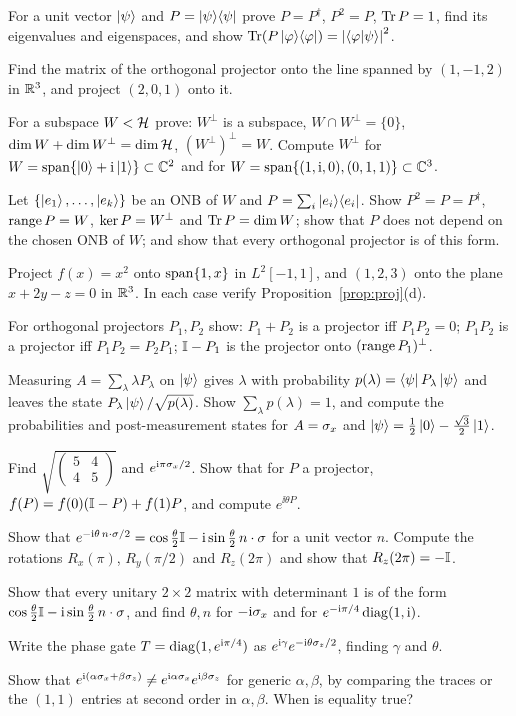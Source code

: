 \begin{exerciseset}
   For a unit vector $\left|\psi\right\rangle$ and $P=\left|\psi\right\rangle\!\left\langle\psi\right|$ prove $P=P^\dagger$, $P^2=P$, $\operatorname{Tr} P=1$, find its eigenvalues and eigenspaces, and show $\operatorname{Tr}(P\left|\varphi\right\rangle\!\left\langle\varphi\right|)=\left|\left\langle\varphi\middle|\psi\right\rangle\right|^2$.

   Find the matrix of the orthogonal projector onto the line spanned by $(1,-1,2)$ in $\mathbb{R}^3$, and project $(2,0,1)$ onto it.

   For a subspace $W<\mathcal{H}$ prove: $W^\perp$ is a subspace, $W\cap W^\perp=\{0\}$, $\dim W+\dim W^\perp=\dim\mathcal{H}$, $(W^\perp)^\perp=W$. Compute $W^\perp$ for $W=\operatorname{span}\{\left|0\right\rangle+\mathrm{i}\left|1\right\rangle\}\subset\mathbb{C}^2$ and for $W=\operatorname{span}\{(1,\mathrm{i},0),(0,1,1)\}\subset\mathbb{C}^3$.

   Let $\{\left|e_1\right\rangle,\dots,\left|e_k\right\rangle\}$ be an ONB of $W$ and $P=\sum_i\left|e_i\right\rangle\!\left\langle e_i\right|$. Show $P^2=P=P^\dagger$, $\operatorname{range} P=W$, $\operatorname{ker} P=W^\perp$ and $\operatorname{Tr} P=\dim W$; show that $P$ does not depend on the chosen ONB of $W$; and show that every orthogonal projector is of this form.

   Project $f(x)=x^2$ onto $\operatorname{span}\{1,x\}$ in $L^2[-1,1]$, and $(1,2,3)$ onto the plane $x+2y-z=0$ in $\mathbb{R}^3$. In each case verify Proposition~\ref{prop:proj}(d).

   For orthogonal projectors $P_1,P_2$ show: $P_1+P_2$ is a projector iff $P_1P_2=0$; $P_1P_2$ is a projector iff $P_1P_2=P_2P_1$; $\mathbb{I}-P_1$ is the projector onto $(\operatorname{range} P_1)^\perp$.

   Measuring $A=\sum_\lambda\lambda P_\lambda$ on $\left|\psi\right\rangle$ gives $\lambda$ with probability $p(\lambda)=\left\langle\psi\right| P_\lambda\left|\psi\right\rangle$ and leaves the state $P_\lambda\left|\psi\right\rangle/\sqrt{p(\lambda)}$. Show $\sum_\lambda p(\lambda)=1$, and compute the probabilities and post-measurement states for $A=\sigma_x$ and $\left|\psi\right\rangle=\tfrac12\left|0\right\rangle-\tfrac{\sqrt3}2\left|1\right\rangle$.

   Find $\sqrt{\begin{pmatrix}5&4\\4&5\end{pmatrix}}$ and $e^{\mathrm{i}\pi\sigma_x/2}$. Show that for $P$ a projector, $f(P)=f(0)(\mathbb{I}-P)+f(1)P$, and compute $e^{\ii\theta P}$.

   Show that $e^{-\mathrm{i}\theta\,n\cdot\sigma/2}=\cos\frac\theta2\mathbb{I}-\mathrm{i}\sin\frac\theta2\,n\cdot\sigma$ for a unit vector $n$. Compute the rotations $R_x(\pi)$, $R_y(\pi/2)$ and $R_z(2\pi)$ and show that $R_z(2\pi)=-\mathbb{I}$.

   Show that every unitary $2\times2$ matrix with determinant $1$ is of the form $\cos\frac\theta2\mathbb{I}-\mathrm{i}\sin\frac\theta2\,n\cdot\sigma$, and find $\theta,n$ for $-\mathrm{i}\sigma_x$ and for $e^{-\mathrm{i}\pi/4}\operatorname{diag}(1,\mathrm{i})$.

   Write the phase gate $T=\operatorname{diag}(1,e^{\mathrm{i}\pi/4})$ as $e^{\mathrm{i}\gamma}e^{-\mathrm{i}\theta\sigma_z/2}$, finding $\gamma$ and $\theta$.

   Show that $e^{\mathrm{i}(\alpha\sigma_x+\beta\sigma_z)}\neq e^{\mathrm{i}\alpha\sigma_x}e^{\mathrm{i}\beta\sigma_z}$ for generic $\alpha,\beta$, by comparing the traces or the $(1,1)$ entries at second order in $\alpha,\beta$. When is equality true?
\end{exerciseset}
